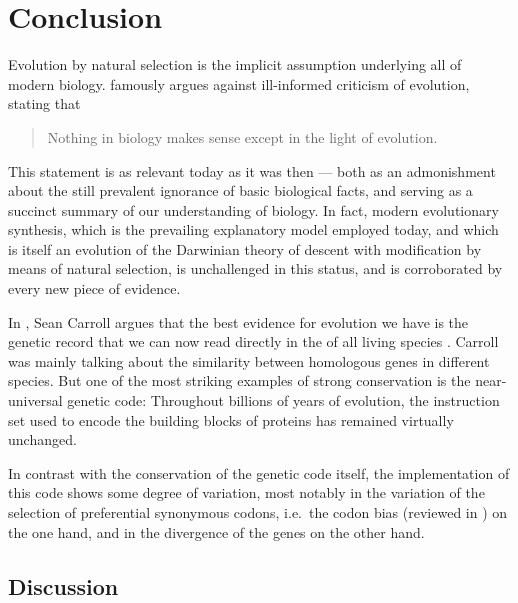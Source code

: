 \chapter{Conclusion}
\label{sec:conclusion}


\noindent
Evolution by natural selection is the implicit assumption underlying all of
modern biology. \citet{Dobzhansky:1973} famously argues against ill-informed
criticism of evolution, stating that

\begin{quote}
    Nothing in biology makes sense except in the light of evolution.
\end{quote}

This statement is as relevant today as it was then --- both as an admonishment
about the still prevalent ignorance of basic biological facts, and serving as a
succinct summary of our understanding of biology. In fact, modern evolutionary
synthesis, which is the prevailing explanatory model employed today, and which
is itself an evolution of the Darwinian theory of descent with modification by
means of natural selection, is unchallenged in this status, and is corroborated
by every new piece of evidence.

In , Sean Carroll argues that the best
evidence for evolution we have is the genetic record that we can now read
directly in the \dna of all living species \citep{Carroll:2006}. Carroll was
mainly talking about the similarity between homologous genes in different
species. But one of the most striking examples of strong conservation is the
near-universal genetic code: Throughout billions of years of evolution, the
instruction set used to encode the building blocks of proteins has remained
virtually unchanged.

In contrast with the conservation of the genetic code itself, the implementation
of this code shows some degree of variation, most notably in the variation of
the selection of preferential synonymous codons, i.e.\ the codon bias (reviewed
in \citet{Ermolaeva:2001}) on the one hand, and in the divergence of the \trna
genes \citep{Kutter:2011} on the other hand.

\section{Discussion}

